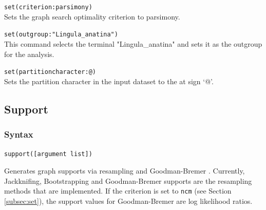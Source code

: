		
	\begin{example}
		\item{\texttt{set(criterion:parsimony)}\\Sets the graph search optimality criterion to 
		parsimony.}

		\item{\texttt{set(outgroup:"Lingula\_anatina")}\\This command selects the terminal 
		"Lingula\_anatina" and sets it as the outgroup for the analysis.}
		
		\item{\texttt{set(partitioncharacter:@)}\\Sets the partition character in the input dataset 
		to the at sign `@'.}
		
	\end{example}

\subsection{Support}
\label{subsec:support}
	\subsubsection{Syntax}
		\texttt{support([argument list])}
		
	\begin{phygdescription}
		{Generates graph supports via resampling \citep{Farrisetal1996} and Goodman-Bremer 
		\citep{Goodmanetal1982, bremer1994}. Currently, Jackknifing, Bootstrapping and 
		Goodman-Bremer supports are the resampling methods that are implemented. If
		the criterion is set to \texttt{ncm} (see Section \ref{subsec:set}), the support values 
		for Goodman-Bremer are log likelihood ratios.}
	\end{phygdescription}
		
